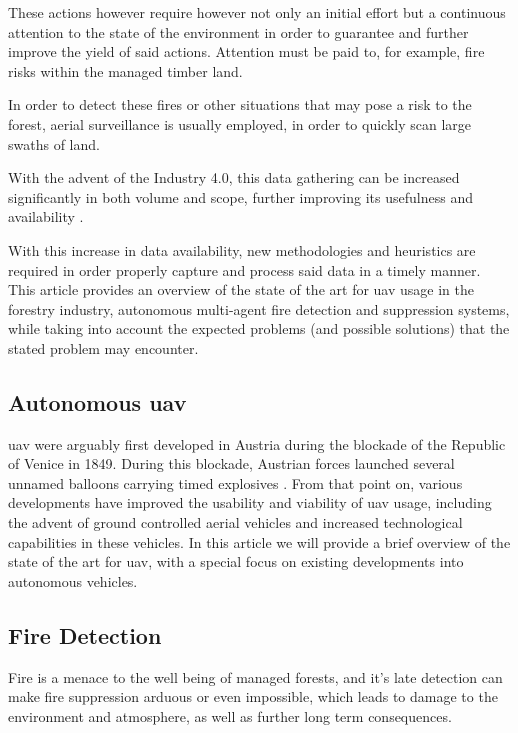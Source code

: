 \documentclass[runningheads]{llncs}
\begin{document}
These actions however require however not only an initial effort but a continuous attention to the state of the environment in order to guarantee and further improve the yield of said actions. Attention must be paid to, for example, fire risks within the managed timber land.

In order to detect these fires or other situations that may pose a risk to the forest, aerial surveillance is usually employed, in order to quickly scan large swaths of land. 

With the advent of the Industry 4.0, this data gathering can be increased significantly in both volume and scope, further improving its usefulness and availability \cite{Hood_Brady_2016}.

With this increase in data availability, new methodologies and heuristics are required in order properly capture and process said data in a timely manner. This article provides an overview of the state of the art for \acrshort{uav} usage in the forestry industry, autonomous multi-agent fire detection and suppression systems, while taking into account the expected problems (and possible solutions) that the stated problem may encounter.

\subsection{Autonomous \acrshort{uav}}

\acrshort{uav} were arguably first developed in Austria during the blockade of the Republic of Venice in 1849. During this blockade, Austrian forces launched several unnamed balloons carrying timed explosives . From that point on, various developments have improved the usability and viability of \acrshort{uav} usage, including the advent of ground controlled aerial vehicles and increased technological capabilities in these vehicles. In this article we will provide a brief overview of the state of the art for \acrshort{uav}, with a special focus on existing developments into autonomous vehicles.

\subsection{Fire Detection}

Fire is a menace to the well being of managed forests, and it's late detection can make fire suppression arduous or even impossible, which leads to damage to the environment and atmosphere, as well as further long term consequences. 
\end{document}

